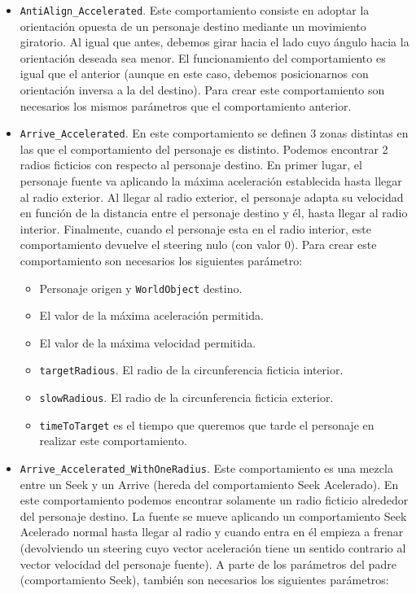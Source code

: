 \begin{itemize}
 \item \texttt{AntiAlign\_Accelerated}. Este comportamiento consiste en adoptar la orientación opuesta de un personaje destino mediante un movimiento giratorio. Al igual que antes, debemos girar hacia el lado cuyo ángulo hacia la orientación deseada sea menor. El funcionamiento del comportamiento es igual que el anterior (aunque en este caso, debemos posicionarnos con orientación inversa a la del destino). Para crear este comportamiento son necesarios los mismos parámetros que el comportamiento anterior.
 \item \texttt{Arrive\_Accelerated}. En este comportamiento se definen 3 zonas distintas en las que el comportamiento del personaje es distinto. Podemos encontrar 2 radios ficticios con respecto al personaje destino. En primer lugar, el personaje fuente va aplicando la máxima aceleración establecida hasta llegar al radio exterior. Al llegar al radio exterior, el personaje adapta su velocidad en función de la distancia entre el personaje destino y él, hasta llegar al radio interior. Finalmente, cuando el personaje esta en el radio interior, este comportamiento devuelve el steering nulo (con valor 0). Para crear este comportamiento son necesarios los siguientes parámetro:
 \begin{itemize}
 	\item Personaje origen y \texttt{WorldObject} destino.
 	\item El valor de la máxima aceleración permitida.
 	\item El valor de la máxima velocidad permitida.
 	\item \texttt{targetRadious}. El radio de la circunferencia ficticia interior.
 	\item \texttt{slowRadious}. El radio de la circunferencia ficticia exterior.
 	\item \texttt{timeToTarget} es el tiempo que queremos que tarde el personaje en realizar este comportamiento.
 \end{itemize}
 \item \texttt{Arrive\_Accelerated\_WithOneRadius}. Este comportamiento es una mezcla entre un Seek y un Arrive (hereda del comportamiento Seek Acelerado). En este comportamiento podemos encontrar solamente un radio ficticio alrededor del personaje destino. La fuente se mueve aplicando un comportamiento Seek Acelerado normal hasta llegar al radio y cuando entra en él empieza a frenar (devolviendo un steering cuyo vector aceleración tiene un sentido contrario al vector velocidad del personaje fuente). A parte de los parámetros del padre (comportamiento Seek), también son necesarios los siguientes parámetros:

\end{itemize}
